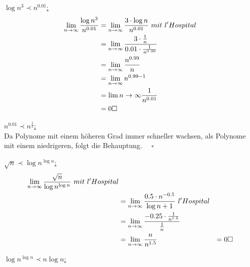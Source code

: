 \documentclass{article}
\begin{document}
\begin{enumerate}
\underline{$\log n^3 \prec n^{0.01}$:} \\
\begin{align*}
    \lim_{n \to \infty} \frac{\log n^3}{n^{0.01}} &= \lim_{n \to \infty}
        \frac{3 \cdot \log n}{n^{0.01}} ~mit~l 'Hospital\\
        &= \lim_{n \to \infty} \frac{3 \cdot \frac{1}{n}}{0.01 \cdot \frac{1}{n^{0.99}}} \\
        &= \lim_{n \to \infty} \frac{n^{0.99}}{n} \\
	&= \lim_{n \to \infty} n^{0.99-1} \\
	&= \lim {n \to \infty} \frac{1}{n^{0.01}} \\
	&= 0 \hfill \square
\end{align*}

\underline{$n^{0.01} \prec n^{\frac{1}{2}}$:} \\
Da Polynome mit einem höheren Grad immer schneller wachsen, als
Polynome mit einem niedrigeren, folgt die Behauptung. $\quad \square$

\underline{$\sqrt{n} \prec \log n^{\log n}$:} \\
\begin{align*}
\lim_{n \to \infty} \frac{\sqrt{n}}{\log n^{ \log n}} ~mit~l'Hospital\\
	&= \lim_{n \to \infty} \frac{0.5 \cdot n^{-0.5}}{\log n +1} ~l 'Hospital\\
        &= \lim_{n \to \infty} \frac{-0.25 \cdot \frac{1}{n^{1.5}}}{\frac{1}{n}}  \\
	&= \lim_{n \to \infty} \frac{n}{n^{1.5}}
        &= 0 \hfill \square
\end{align*}


\underline{$\log n^{\log n} \prec n \log n$:} \\
\begin{align*}
   
\end{align*}



\end{enumerate}
\end{document}
